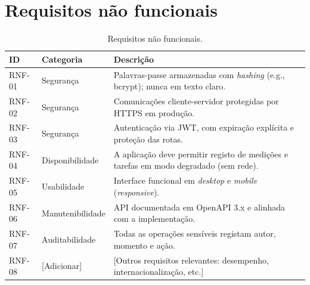 \section{Requisitos não funcionais}
\label{sec:rnf}


\begin{table}[H]
\centering
\caption{Requisitos não funcionais.}
\label{tab:rnf}
\renewcommand{\arraystretch}{1.3}
\begin{tabularx}{\linewidth}{l l X}
\toprule
\textbf{ID} & \textbf{Categoria} & \textbf{Descrição} \\
\midrule
RNF-01 & Segurança       & Palavras-passe armazenadas com \emph{hashing} (e.g., bcrypt); nunca em texto claro. \\
RNF-02 & Segurança       & Comunicações cliente-servidor protegidas por HTTPS em produção. \\
RNF-03 & Segurança       & Autenticação via JWT, com expiração explícita e proteção das rotas. \\
RNF-04 & Disponibilidade & A aplicação deve permitir registo de medições e tarefas em modo degradado (sem rede). \\
RNF-05 & Usabilidade     & Interface funcional em \emph{desktop} e \emph{mobile} (\emph{responsive}). \\
RNF-06 & Manutenibilidade & API documentada em OpenAPI 3.x e alinhada com a implementação. \\
RNF-07 & Auditabilidade  & Todas as operações sensíveis registam autor, momento e ação. \\
RNF-08 & [Adicionar]     & [Outros requisitos relevantes: desempenho, internacionalização, etc.] \\
\bottomrule
\end{tabularx}
\end{table}



